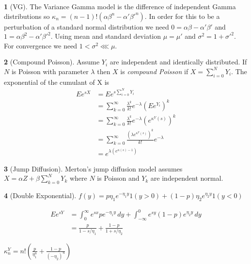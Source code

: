\documentclass[12pt]{article}
\theoremstyle{definition}
\newtheorem*{example}{}
\begin{document}
\begin{example}[VG]
The Variance Gamma model is the difference of independent Gamma distributions
so \(\kappa_n = (n-1)!(\alpha\beta^n - \alpha'\beta'^n)\).
In order for this to be a perturbation of a standard normal
distribution we need \(0 = \alpha\beta - \alpha'\beta'\)
and \(1 = \alpha\beta^2 - \alpha'\beta'^2\).
Using mean and standard deviation
\(\mu = \mu'\) and \(\sigma^2 = 1 + \sigma'^2\).
For convergence we need \(1 < \sigma^2 \lll \mu\).
\end{example}

\begin{example}[Compound Poisson]
Assume \(Y_i\) are independent and identically distributed. If \(N\) is
Poisson with parameter \(\lambda\) then \(X\) is {\em compound Poisson}
if \(X = \sum_{i=0}^N Y_i\).
The exponential of the cumulant of X is
\begin{align*}
Ee^{sX} &= Ee^{s\sum_{i=0}^N Y_i}\\
&= \sum_{k=0}^\infty \frac{\lambda^k}{k!}e^{-\lambda}(Ee^{Y_i})^k\\
&= \sum_{k=0}^\infty \frac{\lambda^k}{k!}e^{-\lambda}(e^{\kappa^Y(s)})^k\\
&= \sum_{k=0}^\infty \frac{(\lambda e^{\kappa^Y(s)})^k}{k!}e^{-\lambda}\\
&= e^{\lambda(e^{\kappa(s) - 1})}
\end{align*}
\end{example}

\begin{example}[Jump Diffusion]
Merton's \cite{Mer?} jump diffusion model assumes
\(X = \alpha Z + \beta\sum_{k=0}^N Y_k\) where
\(N\) is Poisson and \(Y_k\) are independent normal.
\end{example}

\begin{example}[Double Exponential]
\(f(y) = p\eta_1 e^{-\eta_1 y}1(y > 0) + (1 - p)\eta_2 e^{\eta_2 y}1(y < 0)\)

\begin{align*}
Ee^{sY} &= \int_0^\infty e^{sx} pe^{-\eta_1 y}\,dy
+ \int_{-\infty}^0 e^{sy} (1-p)e^{\eta_2 y}\,dy\\
&= \frac{p}{1-s/\eta_1} + \frac{1-p}{1 + s/\eta_2}
\end{align*}

\(\kappa^Y_n = n!(\frac{p}{\eta_1^n} + \frac{1-p}{(-\eta_2)^n})\)
\end{example}

\end{document}
